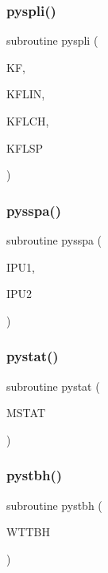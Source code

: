 \subsubsection{\texorpdfstring{pyspli()}{pyspli()}}
{\footnotesize\ttfamily subroutine pyspli (\begin{DoxyParamCaption}\item[{}]{KF,  }\item[{}]{K\+F\+L\+IN,  }\item[{}]{K\+F\+L\+CH,  }\item[{}]{K\+F\+L\+SP }\end{DoxyParamCaption})}

\mbox{\label{pythia-6_84_824_8f_a9f8a08b43157ca5aa62d84247ff26109}} 
\subsubsection{\texorpdfstring{pysspa()}{pysspa()}}
{\footnotesize\ttfamily subroutine pysspa (\begin{DoxyParamCaption}\item[{}]{I\+P\+U1,  }\item[{}]{I\+P\+U2 }\end{DoxyParamCaption})}

\mbox{\label{pythia-6_84_824_8f_a6776838d34f1f049686d19132f43a249}} 
\subsubsection{\texorpdfstring{pystat()}{pystat()}}
{\footnotesize\ttfamily subroutine pystat (\begin{DoxyParamCaption}\item[{}]{M\+S\+T\+AT }\end{DoxyParamCaption})}

\mbox{\label{pythia-6_84_824_8f_a8e204cdd8fb7ba8d843c00f6da2ec7e9}} 
\subsubsection{\texorpdfstring{pystbh()}{pystbh()}}
{\footnotesize\ttfamily subroutine pystbh (\begin{DoxyParamCaption}\item[{}]{W\+T\+T\+BH }\end{DoxyParamCaption})}

